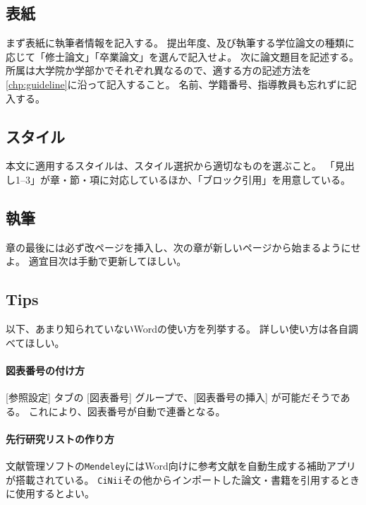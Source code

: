 		\subsection{表紙}
			\label{sub:titlepage_w}

			まず表紙に執筆者情報を記入する。
			提出年度、及び執筆する学位論文の種類に応じて「修士論文」「卒業論文」を選んで記入せよ。
			次に論文題目を記述する。
			所属は大学院か学部かでそれぞれ異なるので、適する方の記述方法を\cref{chp:guideline}に沿って記入すること。
			名前、学籍番号、指導教員も忘れずに記入する。

		\subsection{スタイル}
			\label{sub:style_w}

			本文に適用するスタイルは、スタイル選択から適切なものを選ぶこと。
			「見出し1--3」が章・節・項に対応しているほか、「ブロック引用」を用意している。

		\subsection{執筆}
			\label{sub:writing_w}

			章の最後には必ず改ページを挿入し、次の章が新しいページから始まるようにせよ。
			適宜目次は手動で更新してほしい。


		\subsection{Tips}
			\label{tips}

			以下、あまり知られていないWordの使い方を列挙する。
			詳しい使い方は各自調べてほしい。

			\paragraph{図表番号の付け方}

				[参照設定] タブの [図表番号] グループで、[図表番号の挿入] が可能だそうである。
				これにより、図表番号が自動で連番となる。

			\paragraph{先行研究リストの作り方}

				文献管理ソフトの\texttt{Mendeley}にはWord向けに参考文献を自動生成する補助アプリが搭載されている。
				\texttt{CiNii}その他からインポートした論文・書籍を引用するときに使用するとよい。
